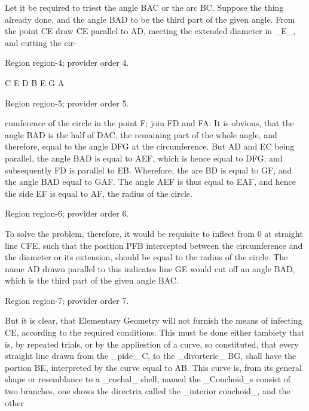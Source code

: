 \documentclass[11pt]{article}
\begin{document}
Let it be required to triest the angle BAC or the arc BC. Suppose the thing already done, and the angle BAD to be the third part of the given angle. From the point CE draw CE parallel to AD, meeting the extended diameter in \_E\_, and cutting the cir-
\par

{\scriptsize\color{gray} Region region-4; provider order 4.\par}
\medskip

C
E
D
B
E
G
A
\par

{\scriptsize\color{gray} Region region-5; provider order 5.\par}
\medskip

cumference of the circle in the point F; join FD and FA. It is obvious, that the angle BAD is the half of DAC, the remaining part of the whole angle, and therefore, equal to the angle DFG at the circumference. But AD and EC being parallel, the angle BAD is equal to AEF, which is hence equal to DFG; and subsequently FD is parallel to EB. Wherefore, the are BD is equal to GF, and the angle BAD equal to GAF. The angle AEF is thus equal to EAF, and hence the side EF is equal to AF, the radius of the circle.
\par

{\scriptsize\color{gray} Region region-6; provider order 6.\par}
\medskip

To solve the problem, therefore, it would be requisite to inflect from 0 at straight line CFE, such that the position PFB intercepted between the circumference and the diameter or its extension, should be equal to the radius of the circle. The name AD drawn parallel to this indicates line GE would cut off an angle BAD, which is the third part of the given angle BAC.
\par

{\scriptsize\color{gray} Region region-7; provider order 7.\par}
\medskip

But it is clear, that Elementary Geometry will not furnish the means of infecting CE, according to the required conditions. This must be done either tambiety that is, by repeated trials, or by the appliestion of a curve, so constituted, that every straight line drawn from the \_pide\_ C, to the \_divorteric\_ BG, shall have the portion BE, interpreted by the curve equal to AB. This curve is, from its general shape or resemblance to a \_cochal\_ shell, named the \_Conchoid\_s consist of two branches, one shows the directrix called the \_interior conchoid\_, and the other
\par
\end{document}
